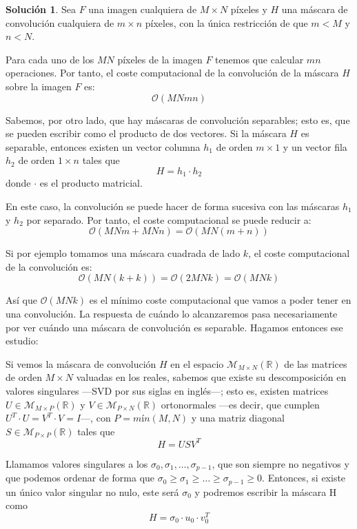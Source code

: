\documentclass[a4paper, 11pt]{article}
\theoremstyle{definition}
\newtheorem*{solucion}{Solución}
\theoremstyle{theorem}
\begin{document}
  \begin{solucion}
      Sea $F$ una imagen cualquiera de $M \times N$ píxeles y $H$ una máscara de convolución cualquiera de $m \times n$ píxeles, con la única restricción de que $m<M$ y $n<N$.

      Para cada uno de los $MN$ píxeles de la imagen $F$ tenemos que calcular $mn$ operaciones. Por tanto, el coste computacional de la convolución de la máscara $H$ sobre la imagen $F$ es:
      \[
      \mathcal{O}(MNmn)
      \]

      Sabemos, por otro lado, que hay máscaras de convolución separables; esto es, que se pueden escribir como el producto de dos vectores. Si la máscara $H$ es separable, entonces existen un vector columna $h_1$ de orden $m \times 1$ y un vector fila $h_2$ de orden $1 \times n$ tales que
      \[
      H = h_1 \cdot h_2
      \]
      donde $\cdot$ es el producto matricial.

      En este caso, la convolución se puede hacer de forma sucesiva con las máscaras $h_1$ y $h_2$ por separado. Por tanto, el coste computacional se puede reducir a:
      \[
      \mathcal{O}(MNm+MNn) = \mathcal{O}(MN(m+n))
      \]

      Si por ejemplo tomamos una máscara cuadrada de lado $k$, el coste computacional de la convolución es:
      \[
      \mathcal{O}(MN(k+k)) = \mathcal{O}(2MNk) = \mathcal{O}(MNk)
      \]

      Así que $\mathcal{O}(MNk)$ es el mínimo coste computacional que vamos a poder tener en una convolución. La respuesta de cuándo lo alcanzaremos pasa necesariamente por ver cuándo una máscara de convolución es separable. Hagamos entonces ese estudio:

      Si vemos la máscara de convolución $H$ en el espacio $\mathcal{M}_{M\times N}(\mathbb{R})$ de las matrices de orden $M\times N$ valuadas en los reales, sabemos que existe su descomposición en valores singulares ---SVD por sus siglas en inglés---; esto es, existen matrices $U\in\mathcal{M}_{M\times P}(\mathbb{R})$ y $V\in\mathcal{M}_{P\times N}(\mathbb{R})$ ortonormales ---es decir, que cumplen $U^T\cdot U=V^T\cdot V=I$---, con $P=mín(M,N)$ y una matriz diagonal $S\in\mathcal{M}_{P\times P}(\mathbb{R})$ tales que
      \[
      H = USV^T
      \]

      Llamamos valores singulares a los $\sigma_0, \sigma_1, \dots, \sigma_{p-1}$, que son siempre no negativos y que podemos ordenar de forma que $\sigma_0 \geq \sigma_1 \geq \dots \geq \sigma_{p-1} \geq 0$. Entonces, si existe un único valor singular no nulo, este será $\sigma_0$ y podremos escribir la máscara H como
      \[
      H = \sigma_0\cdot u_0 \cdot v_0^T
      \]


\end{solucion}
\end{document}
